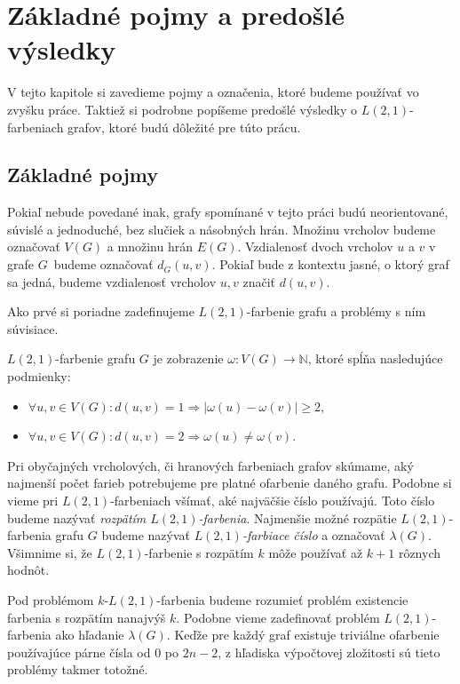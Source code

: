 \chapter{Základné pojmy a predošlé výsledky}

V tejto kapitole si zavedieme pojmy a označenia, ktoré budeme používať
vo zvyšku práce. Taktiež si podrobne popíšeme predošlé výsledky o
$L(2,1)$-farbeniach grafov, ktoré budú dôležité pre túto prácu.

\section{Základné pojmy}

Pokiaľ nebude povedané inak, grafy spomínané v tejto práci budú neorientované,
súvislé a jednoduché, bez slučiek a násobných hrán. Množinu vrcholov budeme
označovať $V(G)$ a množinu hrán $E(G)$. Vzdialenosť dvoch vrcholov $u$ a $v$
v grafe $G$ budeme označovať $d_G(u,v)$. Pokiaľ bude z kontextu jasné, o
ktorý graf sa jedná, budeme vzdialenosť vrcholov $u, v$ značiť $d(u,v)$.

Ako prvé si poriadne
zadefinujeme $L(2,1)$-farbenie grafu a problémy s ním súvisiace.

\begin{defn}
    $L(2,1)$-farbenie grafu $G$ je zobrazenie $\omega : V(G) \to \mathbb{N}$,
    ktoré spĺňa nasledujúce podmienky:

    \begin{itemize}
        \item $\forall u, v \in V(G): d(u, v) = 1 \Rightarrow \left| \omega(u) - \omega(v) \right| \ge 2$,
        \item $\forall u, v \in V(G): d(u, v) = 2 \Rightarrow \omega(u) \neq \omega(v)$.
    \end{itemize}
\end{defn}

Pri obyčajných vrcholových, či hranových farbeniach grafov skúmame, aký
najmenší počet farieb potrebujeme pre platné ofarbenie daného grafu. Podobne
si vieme pri $L(2,1)$-farbeniach všímať, aké najväčšie číslo používajú. Toto
číslo budeme nazývať \emph{rozpätím $L(2,1)$-farbenia}. Najmenšie možné rozpätie
$L(2,1)$-farbenia grafu $G$ budeme nazývať \emph{$L(2,1)$-farbiace číslo} a
označovať $\lambda(G)$. Všimnime si, že $L(2,1)$-farbenie s
rozpätím $k$ môže používať až $k+1$ rôznych hodnôt.

Pod problémom $k$-$L(2,1)$-farbenia budeme rozumieť problém existencie farbenia
s rozpätím nanajvýš $k$. Podobne vieme zadefinovať problém $L(2,1)$-farbenia ako
hľadanie $\lambda(G)$. Keďže pre každý graf existuje triviálne ofarbenie
používajúce párne čísla od $0$ po $2n - 2$, z hľadiska výpočtovej zložitosti
sú tieto problémy takmer totožné.

